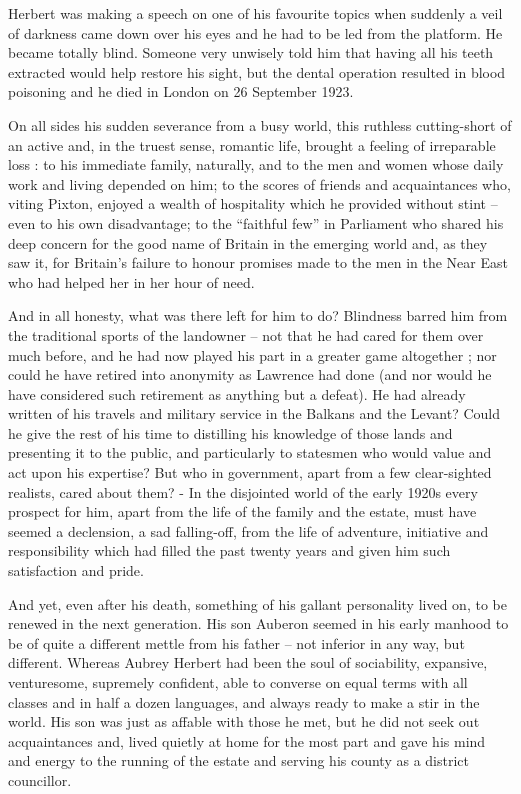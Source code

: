 Herbert was making a speech on one of his favourite topics when suddenly a veil of darkness came down over his eyes and he had to be led from the platform. He became totally blind. Someone very unwisely told him that having all his teeth extracted would help restore his sight, but the dental operation resulted in blood poisoning and he died in London on 26 September 1923.

On all sides his sudden severance from a busy world, this ruthless cutting-short of an active and, in the truest sense, romantic life, brought a feeling of irreparable loss : to his immediate family, naturally, and to the men and women whose daily work and living depended on him; to the scores of friends and acquaintances who, viting Pixton, enjoyed a wealth of hospitality which he provided without stint – even to his own disadvantage; to the “faithful few” in Parliament who shared his deep concern for the good name of Britain in the emerging world and, as they saw it, for Britain’s failure to honour promises made to the men in the Near East who had helped her in her hour of need.

And in all honesty, what was there left for him to do? Blindness barred him from the traditional sports of the landowner – not that he had cared for them over much before, and he had now played his part in a greater game altogether ; nor could he have retired into anonymity as Lawrence had done (and nor would he have considered such retirement as anything but a defeat). He had already written of his travels and military service in the Balkans and the Levant? Could he give the rest of his time to distilling his knowledge of those lands and presenting it to the public, and particularly to statesmen who would value and act upon his expertise? But who in government, apart from a few clear-sighted realists, cared about them? - In the disjointed world of the early 1920s every prospect for him, apart from the life of the family and the estate, must have seemed a declension, a sad falling-off, from the life of adventure, initiative and responsibility which had filled the past twenty years and given him such satisfaction and pride. 

And yet, even after his death, something of his gallant personality lived on, to be renewed in the next generation. His son Auberon seemed in his early manhood to be of quite a different mettle from his father – not inferior in any way, but different. Whereas Aubrey Herbert had been the soul of sociability, expansive, venturesome, supremely confident, able to converse on equal terms with all classes and in half a dozen languages, and always ready to make a stir in the world. His son was just as affable with those he met, but he did not seek out acquaintances and, lived quietly at home for the most part and gave his mind and energy to the running of the estate and serving his county as a district councillor. 

